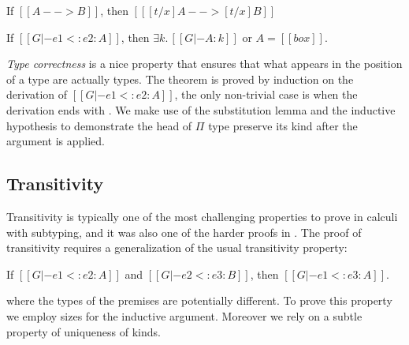 \begin{lemma}
   If $[[A --> B]]$, then $[[ [t / x] A --> [t / x] B ]]$
\end{lemma}

\begin{theorem}
    If $[[G |- e1 <: e2 : A]]$,
    then $\exists k.\, [[G |- A : k]]$ or $A = [[box]]$.
\end{theorem}

\noindent \emph{Type correctness} is a nice property that ensures that
what appears in the position of a type are actually types.
The theorem is proved by induction on the derivation of $[[G |- e1 <: e2 : A]]$,
the only non-trivial case is when the derivation ends with . We make
use of the substitution lemma and the inductive hypothesis to demonstrate the head
of $\Pi$ type preserve its kind after the argument is applied.

\subsection{Transitivity}
\label{sec:transitivity}

Transitivity is typically one of the most challenging properties to prove in
calculi with subtyping, and it was also one of the harder proofs in \name.
The proof of transitivity requires a generalization of the usual transitivity
property:

\begin{theorem}
    If $[[G |- e1 <: e2 : A]]$ and $[[G |- e2 <: e3 : B]]$,
    then $[[G |- e1 <: e3 : A]]$.
\end{theorem}

\noindent where the types of the premises are potentially different.
To prove this property we employ sizes for the inductive argument. Moreover we rely on
a subtle property of uniqueness of kinds.

\begin{comment}
Usually \emph{transitivity} in a dependently-typed subtyping system is axiomized
in the declarative system.
Then a process is went through called the ``transitivity elimination'', which proves
the admissibility of transitivity in the declarative systems with the help of
their algorithmic version \cite{hutchins2010pure}\cite{aspinall1996subtyping}.
However Unified Subtyping help us simplify the process and prove the
transitivity directly\cite{yang2017unifying}. We prove the generalized
version of transitivity with the types of premises being potentially
syntactically different. Then the ``restricted'' version of transitivity follows directly.
\end{comment}


